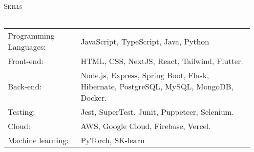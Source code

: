 \documentclass[a4paper]{article}
\newcommand{\lineunder} {
    \vspace*{-8pt} \\
    \hspace*{-18pt} \hrulefill \\
}
\newcommand{\header} [1] {
    {\hspace*{-18pt}\vspace*{6pt} \textsc{#1}}
    \vspace*{-6pt} \lineunder
}
\begin{document}
\header{Skills}
\begin{tabular}{ l l }
	Programming Languages: & JavaScript, TypeScript, Java, Python                                                 \\
	Front-end:             & HTML, CSS, NextJS, React, Tailwind, Flutter.                                         \\
	Back-end:              & Node.js, Express, Spring Boot, Flask, Hibernate, PostgreSQL, MySQL, MongoDB, Docker. \\
	Testing:               & Jest, SuperTest. Junit, Puppeteer, Selenium.                                         \\
	Cloud:                 & AWS, Google Cloud, Firebase, Vercel.                                                 \\
	Machine learning:      & PyTorch, SK-learn                                                                    \\
\end{tabular}
\vspace{2mm}
\end{document}
